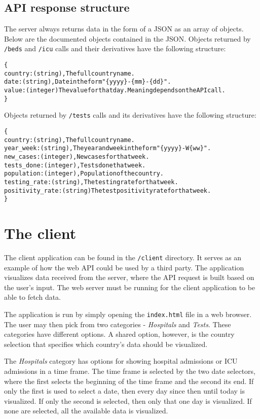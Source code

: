 \documentclass[pdftex, 11pt, a4paper]{article}
\newcommand{\code}{\texttt}
\begin{document}
    \subsection{API response structure} \label{sec:api_response}
    The server always returns data in the form of a JSON as an array of objects.
    Below are the documented objects contained in the JSON.\newline
    Objects returned by \code{/beds} and \code{/icu} calls and their derivatives
    have the following structure:
    \begin{alltt}
    \{
        country: (string),  The full country name.
        date: (string),     Date in the form "\{yyyy\}-\{mm\}-\{dd\}".
        value: (integer)    The value for that day. Meaning depends on the API call.
    \}
    \end{alltt}
    Objects returned by \code{/tests} calls and its derivatives
    have the following structure:
    \begin{alltt}
    \{
        country: (string),          The full country name.
        year_week: (string),        The year and week in the form "\{yyyy\}-W\{ww\}".
        new_cases: (integer),       New cases for that week.
        tests_done: (integer),      Tests done that week.
        population: (integer),      Population of the country.
        testing_rate: (string),     The testing rate for that week.
        positivity_rate: (string)   The test positivity rate for that week.
    \}
    \end{alltt}

    \section{The client}
    The client application can be found in the \code{/client} directory. It serves as
    an example of how the web API could be used by a third party. The application
    visualizes data received from the server, where the API request is built based on
    the user's input. The web server must be running for the client application to
    be able to fetch data.

    The application is run by simply opening the \code{index.html} file in a web browser.
    The user may then pick from two categories - \emph{Hospitals} and \emph{Tests}. These
    categories have different options. A shared option, however, is the country selection
    that specifies which country's data should be visualized.

    The \emph{Hospitals} category has options for showing hospital admissions or ICU
    admissions in a time frame. The time frame is selected by the two date selectors,
    where the first selects the beginning of the time frame and the second its end.
    If only the first is used to select a date, then every day since then until today
    is visualized. If only the second is selected, then only that one day is visualized.
    If none are selected, all the available data is visualized.
\end{document}

